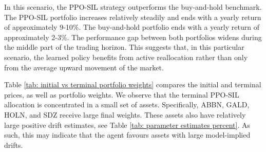 In this scenario, the PPO-SIL strategy outperforms the buy-and-hold benchmark. The PPO-SIL portfolio increases relatively steadily and ends with a yearly return of approximately 9-10\%. The buy-and-hold portfolio ends with a yearly return of approximately 2-3\%. The performance gap between both portfolios widens during the middle part of the trading horizon. This suggests that, in this particular scenario, the learned policy benefits from active reallocation rather than only from the average upward movement of the market. %

Table \ref{tab: initial vs terminal portfolio weights} compares the initial and terminal prices, as well as portfolio weights. We observe that the terminal PPO-SIL allocation is concentrated in a small set of assets. Specifically, ABBN, GALD, HOLN, and SDZ receive large final weights. These assets also have relatively large positive drift estimates, see Table \ref{tab: parameter estimates percent}. As such, this may indicate that the agent favours assets with large model-implied drifts. %
